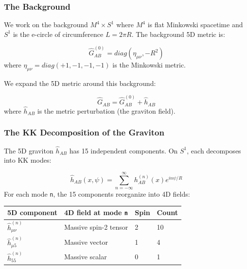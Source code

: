 \documentclass[aps,prd,preprint,superscriptaddress,longbibliography,floatfix]{revtex4-2}
\theoremstyle{remark}
\begin{document}
\subsubsection{The Background}

We work on the background $M^{4} \times S^{1}$ where $M^{4}$ is flat Minkowski spacetime and $S^{1}$ is the e-circle of circumference $L = 2\pi R$. The background 5D metric is:


\begin{equation}
    \hat{G}_{AB}^{(0)} = diag(\eta_{\mu\nu}, -R^{2})
\end{equation}
where $\eta_{\mu\nu} = diag(+1, -1, -1, -1)$ is the Minkowski metric.

We expand the 5D metric around this background:


\begin{equation}
    \hat{G}_{AB} = \hat{G}_{AB}^{(0)} + \hat{h}_{AB}
\end{equation}
where $\hat{h}_{AB}$ is the metric perturbation (the graviton field).


\subsubsection{The KK Decomposition of the Graviton}

The 5D graviton $\hat{h}_{AB}$ has 15 independent components. On $S^{1}$, each decomposes into KK modes:


\begin{equation}
    \hat{h}_{AB}(x, \psi) = \sum_{n=-\infty}^{\infty} h_{AB}^{(n)}(x) e^{in\psi/R}
\end{equation}
For each mode \texttt{n}, the 15 components reorganize into 4D fields:


\begin{table}[H]
\begin{ruledtabular}
\begin{tabular}{p{3.8cm}p{3.8cm}p{3.8cm}p{3.8cm}}
5D component & 4D field at mode \texttt{n} & Spin & Count \\
\hline
$\hat{h}_{\mu\nu}^{(n)}$ & Massive spin-2 tensor & 2 & 10 \\
$\hat{h}_{\mu5}^{(n)}$ & Massive vector & 1 & 4 \\
$\hat{h}_{55}^{(n)}$ & Massive scalar & 0 & 1 \\
\end{tabular}
\end{ruledtabular}
\end{table}
\end{document}
